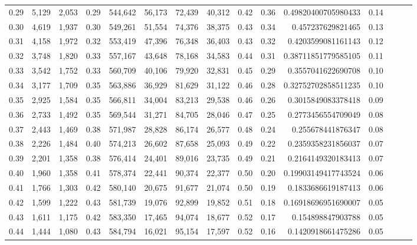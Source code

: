 \begin{tabular}{rrrrrrrrrrrrrrr}
0.29 &   5,129 &  2,053 &  0.29 &  544,642 &   56,173 &   72,439 &   40,312 &  0.42 &  0.36 &     0.49820400705980433 &      0.14 \\
0.30 &   4,619 &  1,937 &  0.30 &  549,261 &   51,554 &   74,376 &   38,375 &  0.43 &  0.34 &       0.457237629821465 &      0.13 \\
0.31 &   4,158 &  1,972 &  0.32 &  553,419 &   47,396 &   76,348 &   36,403 &  0.43 &  0.32 &      0.4203599081161143 &      0.12 \\
0.32 &   3,748 &  1,820 &  0.33 &  557,167 &   43,648 &   78,168 &   34,583 &  0.44 &  0.31 &     0.38711851779585105 &      0.11 \\
0.33 &   3,542 &  1,752 &  0.33 &  560,709 &   40,106 &   79,920 &   32,831 &  0.45 &  0.29 &      0.3557041622690708 &      0.10 \\
0.34 &   3,177 &  1,709 &  0.35 &  563,886 &   36,929 &   81,629 &   31,122 &  0.46 &  0.28 &     0.32752702858511235 &      0.10 \\
0.35 &   2,925 &  1,584 &  0.35 &  566,811 &   34,004 &   83,213 &   29,538 &  0.46 &  0.26 &      0.3015849083378418 &      0.09 \\
0.36 &   2,733 &  1,492 &  0.35 &  569,544 &   31,271 &   84,705 &   28,046 &  0.47 &  0.25 &      0.2773456554709049 &      0.08 \\
0.37 &   2,443 &  1,469 &  0.38 &  571,987 &   28,828 &   86,174 &   26,577 &  0.48 &  0.24 &       0.255678441876347 &      0.08 \\
0.38 &   2,226 &  1,484 &  0.40 &  574,213 &   26,602 &   87,658 &   25,093 &  0.49 &  0.22 &      0.2359358231856037 &      0.07 \\
0.39 &   2,201 &  1,358 &  0.38 &  576,414 &   24,401 &   89,016 &   23,735 &  0.49 &  0.21 &      0.2164149320183413 &      0.07 \\
0.40 &   1,960 &  1,358 &  0.41 &  578,374 &   22,441 &   90,374 &   22,377 &  0.50 &  0.20 &     0.19903149417743524 &      0.06 \\
0.41 &   1,766 &  1,303 &  0.42 &  580,140 &   20,675 &   91,677 &   21,074 &  0.50 &  0.19 &      0.1833686619187413 &      0.06 \\
0.42 &   1,599 &  1,222 &  0.43 &  581,739 &   19,076 &   92,899 &   19,852 &  0.51 &  0.18 &     0.16918696951690007 &      0.05 \\
0.43 &   1,611 &  1,175 &  0.42 &  583,350 &   17,465 &   94,074 &   18,677 &  0.52 &  0.17 &       0.154898847903788 &      0.05 \\
0.44 &   1,444 &  1,080 &  0.43 &  584,794 &   16,021 &   95,154 &   17,597 &  0.52 &  0.16 &      0.1420918661475286 &      0.05 \\

\end{tabular}

